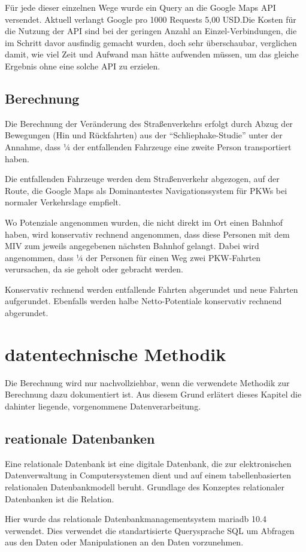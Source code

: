\documentclass[fontsize=12pt,a4paper]{scrreprt}
\begin{document}
Für jede dieser einzelnen Wege wurde ein Query an die Google Maps API versendet. Aktuell verlangt Google pro 1000 Requests 5,00 USD.\@ Die Kosten für die Nutzung der API sind bei der geringen Anzahl an Einzel-Verbindungen, die im Schritt davor ausfindig gemacht wurden, doch sehr überschaubar, verglichen damit, wie viel Zeit und Aufwand man hätte aufwenden müssen, um das gleiche Ergebnis ohne eine solche API zu erzielen.
        \section{Berechnung}
Die Berechnung der Veränderung des Straßenverkehrs erfolgt durch Abzug der Bewegungen (Hin und Rückfahrten) aus der \enquote{Schliephake-Studie} unter der Annahme, dass ¼ der entfallenden Fahrzeuge eine zweite Person transportiert haben.

Die entfallenden Fahrzeuge werden dem Straßenverkehr abgezogen, auf der Route, die Google Maps als Dominantestes Navigationssystem für PKWs bei normaler Verkehrslage empfielt.

Wo Potenziale angenommen wurden, die nicht direkt im Ort einen Bahnhof haben, wird konservativ rechnend angenommen, dass diese Personen mit dem MIV zum jeweils angegebenen nächsten Bahnhof gelangt. Dabei wird angenommen, dass ¼ der Personen für einen Weg zwei PKW-Fahrten verursachen, da sie geholt oder gebracht werden.

Konservativ rechnend werden entfallende Fahrten abgerundet und neue Fahrten aufgerundet. Ebenfalls werden halbe Netto-Potentiale konservativ rechnend abgerundet.


    \chapter{datentechnische Methodik}
Die Berechnung wird nur nachvollziehbar, wenn die verwendete Methodik zur Berechnung dazu dokumentiert ist. Aus diesem Grund erlätert dieses Kapitel die dahinter liegende, vorgenommene Datenverarbeitung.
        \section{reationale Datenbanken}
Eine relationale Datenbank ist eine digitale Datenbank, die zur elektronischen Datenverwaltung in Computersystemen dient und auf einem tabellenbasierten relationalen Datenbankmodell beruht. Grundlage des Konzeptes relationaler Datenbanken ist die Relation.

Hier wurde das relationale Datenbankmanagementsystem mariadb 10.4 verwendet. Dies verwendet die standartisierte Querysprache SQL um Abfragen aus den Daten oder Manipulationen an den Daten vorzunehmen.
\end{document}
